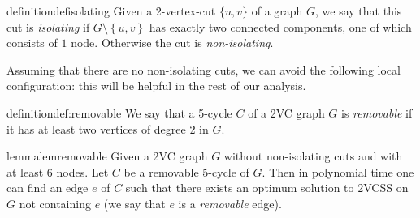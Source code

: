 \documentclass{article}
\newcommand{\set}[1]{\left\{#1 \right\}}
\begin{document}
\begin{restatable}{definition}{defisolating}
Given a 2-vertex-cut $\{u,v\}$ of a graph $G$, we say that this cut is \emph{isolating} if $G\setminus\set{u,v}$ has exactly two connected components, one of which consists of $1$ node. Otherwise the cut is \emph{non-isolating}.
\end{restatable}
Assuming that there are no non-isolating cuts, we can avoid the following local configuration: this will be helpful in the rest of our analysis.
\begin{restatable}{definition}{def:removable}
    We say that a 5-cycle $C$ of a 2VC graph $G$ is \emph{removable} if it has at least two vertices of degree 2 in $G$.
\end{restatable}
\begin{restatable}{lemma}{lemremovable}\label{lem:removable}
    Given a 2VC graph $G$ without non-isolating cuts and with at least $6$ nodes. Let $C$ be a removable 5-cycle of $G$. Then in polynomial time one can find an edge $e$ of $C$ such that there exists an optimum solution to 2VCSS on $G$ not containing $e$ (we say that $e$ is a \emph{removable} edge).
\end{restatable}
\end{document}
